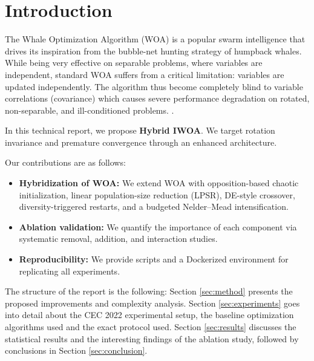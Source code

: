 \documentclass[conference]{IEEEtran}
\begin{document}
\IEEEpeerreviewmaketitle

\section{Introduction}
\label{sec:intro}

The Whale Optimization Algorithm (WOA) \cite{mirjalili2016woa} is a popular swarm intelligence that drives its inspiration from the bubble-net hunting strategy of humpback whales. While being very effective on separable problems, where variables are independent, standard WOA suffers from a critical limitation: variables are updated independently. The algorithm thus become completely blind to variable correlations (covariance) which causes severe performance degradation on rotated, non-separable, and ill-conditioned problems. \cite{cec2022}.

In this technical report, we propose \textbf{Hybrid IWOA}. We target rotation invariance and premature convergence through an enhanced architecture.

Our contributions are as follows:
\begin{itemize}
    \item \textbf{Hybridization of WOA:} We extend WOA with opposition-based chaotic initialization, linear population-size reduction (LPSR), DE-style crossover, diversity-triggered restarts, and a budgeted Nelder--Mead intensification.
    \item \textbf{Ablation validation:} We quantify the importance of each component via systematic removal, addition, and interaction studies.
    \item \textbf{Reproducibility:} We provide scripts and a Dockerized environment for replicating all experiments.
\end{itemize}

The structure of the report is the following: Section \ref{sec:method} presents the proposed improvements and complexity analysis. Section \ref{sec:experiments} goes into detail about the CEC 2022 experimental setup, the baseline optimization algorithms used and the exact protocol used. Section \ref{sec:results} discusses the statistical results and the interesting findings of the ablation study, followed by conclusions in Section \ref{sec:conclusion}.

\end{document}
